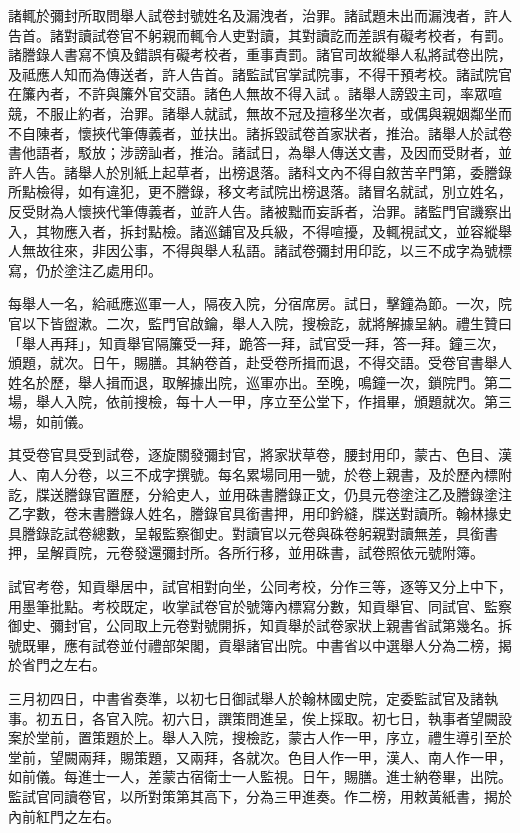 \begin{pinyinscope}
 諸輒於彌封所取問舉人試卷封號姓名及漏洩者，治罪。諸試題未出而漏洩者，許人告首。諸對讀試卷官不躬親而輒令人吏對讀，其對讀訖而差誤有礙考校者，有罰。諸謄錄人書寫不慎及錯誤有礙考校者，重事責罰。諸官司故縱舉人私將試卷出院，及祗應人知而為傳送者，許人告首。諸監試官掌試院事，不得干預考校。諸試院官在簾內者，不許與簾外官交語。諸色人無故不得入試。諸舉人謗毀主司，率眾喧競，不服止約者，治罪。諸舉人就試，無故不冠及擅移坐次者，或偶與親姻鄰坐而不自陳者，懷挾代筆傳義者，並扶出。諸拆毀試卷首家狀者，推治。諸舉人於試卷書他語者，駁放；涉謗訕者，推治。諸試日，為舉人傳送文書，及因而受財者，並許人告。諸舉人於別紙上起草者，出榜退落。諸科文內不得自敘苦辛門第，委謄錄所點檢得，如有違犯，更不謄錄，移文考試院出榜退落。諸冒名就試，別立姓名，反受財為人懷挾代筆傳義者，並許人告。諸被黜而妄訴者，治罪。諸監門官譏察出入，其物應入者，拆封點檢。諸巡鋪官及兵級，不得喧擾，及輒視試文，並容縱舉人無故往來，非因公事，不得與舉人私語。諸試卷彌封用印訖，以三不成字為號標寫，仍於塗注乙處用印。



 每舉人一名，給祗應巡軍一人，隔夜入院，分宿席房。試日，擊鐘為節。一次，院官以下皆盥漱。二次，監門官啟鑰，舉人入院，搜檢訖，就將解據呈納。禮生贊曰「舉人再拜」，知貢舉官隔簾受一拜，跪答一拜，試官受一拜，答一拜。鐘三次，頒題，就次。日午，賜膳。其納卷首，赴受卷所揖而退，不得交語。受卷官書舉人姓名於歷，舉人揖而退，取解據出院，巡軍亦出。至晚，鳴鐘一次，鎖院門。第二場，舉人入院，依前搜檢，每十人一甲，序立至公堂下，作揖畢，頒題就次。第三場，如前儀。



 其受卷官具受到試卷，逐旋關發彌封官，將家狀草卷，腰封用印，蒙古、色目、漢人、南人分卷，以三不成字撰號。每名累場同用一號，於卷上親書，及於歷內標附訖，牒送謄錄官置歷，分給吏人，並用硃書謄錄正文，仍具元卷塗注乙及謄錄塗注乙字數，卷末書謄錄人姓名，謄錄官具銜書押，用印鈐縫，牒送對讀所。翰林掾史具謄錄訖試卷總數，呈報監察御史。對讀官以元卷與硃卷躬親對讀無差，具銜書押，呈解貢院，元卷發還彌封所。各所行移，並用硃書，試卷照依元號附簿。



 試官考卷，知貢舉居中，試官相對向坐，公同考校，分作三等，逐等又分上中下，用墨筆批點。考校既定，收掌試卷官於號簿內標寫分數，知貢舉官、同試官、監察御史、彌封官，公同取上元卷對號開拆，知貢舉於試卷家狀上親書省試第幾名。拆號既畢，應有試卷並付禮部架閣，貢舉諸官出院。中書省以中選舉人分為二榜，揭於省門之左右。



 三月初四日，中書省奏準，以初七日御試舉人於翰林國史院，定委監試官及諸執事。初五日，各官入院。初六日，譔策問進呈，俟上採取。初七日，執事者望闕設案於堂前，置策題於上。舉人入院，搜檢訖，蒙古人作一甲，序立，禮生導引至於堂前，望闕兩拜，賜策題，又兩拜，各就次。色目人作一甲，漢人、南人作一甲，如前儀。每進士一人，差蒙古宿衛士一人監視。日午，賜膳。進士納卷畢，出院。監試官同讀卷官，以所對策第其高下，分為三甲進奏。作二榜，用敕黃紙書，揭於內前紅門之左右。




\end{pinyinscope}
